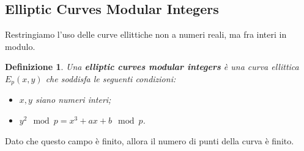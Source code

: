 \documentclass{book}
\newtheorem{Definizione}{\textbf{Definizione}}
\begin{document}
\subsection{Elliptic Curves Modular Integers}
Restringiamo l'uso delle curve ellittiche non a numeri reali, ma fra interi in modulo.
\begin{Definizione}
	Una \textbf{elliptic curves modular integers} è una curva ellittica \(E_{p}(x,y)\) che soddisfa le seguenti condizioni:\begin{itemize}
		\item  \(x,y\) siano numeri interi;
		\item \(y^{2}\mod{p}=x^{3}+ax+b \mod{p}\).
	\end{itemize}
\end{Definizione}
Dato che questo campo è finito, allora il numero di punti della curva è finito\@.\newpage
\end{document}
